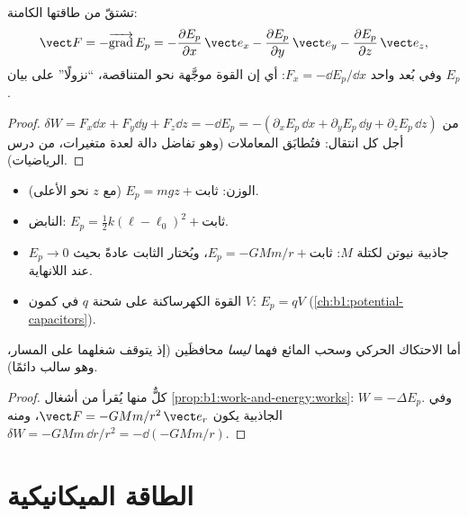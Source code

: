 \begin{proposition}\label{prop:b1:work-and-energy:gradient}
تشتقّ  من طاقتها الكامنة:
\[
\vect F = -\overrightarrow{\operatorname{grad}}\,E_p
= -\frac{\partial E_p}{\partial x}\,\vect e_x
- \frac{\partial E_p}{\partial y}\,\vect e_y
- \frac{\partial E_p}{\partial z}\,\vect e_z ,
\]
وفي بُعد واحد $F_x = -\dd E_p/\dd x$: أي إن القوة موجَّهة نحو
 المتناقصة، ``نزولًا'' على بيان $E_p$.
\end{proposition}

\begin{proof}
$\delta W = F_x\dd x + F_y\dd y + F_z\dd z = -\dd E_p = -(\partial_xE_p\,\dd x
+ \partial_yE_p\,\dd y + \partial_zE_p\,\dd z)$ من أجل كل انتقال:
فتُطابَق المعاملات (وهو تفاضل دالة لعدة
متغيرات، من درس الرياضيات).
\end{proof}

\begin{proposition}\label{prop:b1:work-and-energy:eps}
\begin{itemize}
  \item الوزن: $E_p = mgz + \text{ثابت}$ (مع $z$ نحو الأعلى).
  \item النابض: $E_p = \tfrac12 k(\ell - \ell_0)^2 + \text{ثابت}$.
  \item جاذبية نيوتن لكتلة $M$: $E_p = -GMm/r + \text{ثابت}$،
        ويُختار الثابت عادةً بحيث $E_p \to 0$ عند اللانهاية.
  \item القوة الكهرساكنة على شحنة $q$ في كمون $V$:
        $E_p = qV$ (\cref{ch:b1:potential-capacitors}).
\end{itemize}
أما الاحتكاك الحركي وسحب المائع فهما \emph{ليسا} محافظَين (إذ يتوقف
شغلهما على المسار، وهو سالب دائمًا).
\end{proposition}

\begin{proof}
كلٌّ منها يُقرأ من أشغال \cref{prop:b1:work-and-energy:works}:
$W = -\Delta E_p$. وفي الجاذبية يكون $\vect F = -GMm/r^2\,\vect e_r$، ومنه
$\delta W = -GMm\,\dd r/r^2 = -\dd(-GMm/r)$.
\end{proof}

\section{الطاقة الميكانيكية}

